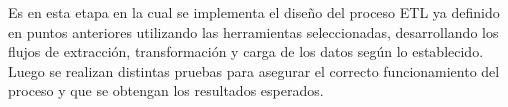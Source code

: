 Es en esta etapa en la cual se implementa el diseño del proceso ETL ya definido en puntos anteriores utilizando las herramientas seleccionadas, desarrollando los flujos de extracción, transformación y carga de los datos según lo establecido.
Luego se realizan distintas pruebas para asegurar el correcto funcionamiento del proceso y que se obtengan los resultados esperados.